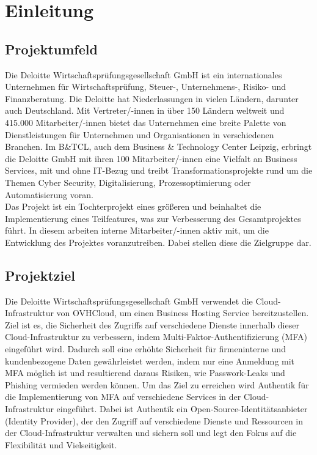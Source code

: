 
\section{Einleitung}
\label{sec:Einleitung}


\subsection{Projektumfeld} 
\label{sec:Projektumfeld}
Die Deloitte Wirtschaftsprüfungsgesellschaft GmbH ist ein internationales 
Unternehmen für Wirtschaftsprüfung, Steuer-, Unternehmens-, Risiko- und Finanzberatung.
Die Deloitte hat Niederlassungen in vielen Ländern, darunter auch Deutschland. 
Mit Vertreter/-innen in über 150 Ländern weltweit und 415.000 Mitarbeiter/-innen bietet das Unternehmen eine breite Palette 
von Dienstleistungen für Unternehmen und Organisationen in verschiedenen Branchen.
Im B\&TCL, auch dem Business \& Technology Center Leipzig, erbringt die Deloitte
GmbH mit ihren 100 Mitarbeiter/-innen eine Vielfalt an Business Services, mit und ohne IT-Bezug und treibt
Transformationsprojekte rund um die Themen Cyber Security, Digitalisierung,
Prozessoptimierung oder Automatisierung voran.
\\Das Projekt ist ein Tochterprojekt eines größeren und beinhaltet die Implementierung eines Teilfeatures, was zur 
Verbesserung des Gesamtprojektes führt. In diesem arbeiten interne Mitarbeiter/-innen aktiv mit, um die Entwicklung des
Projektes voranzutreiben. Dabei stellen diese die Zielgruppe dar.


\subsection{Projektziel} 
\label{sec:Projektziel}
Die Deloitte Wirtschaftsprüfungsgesellschaft GmbH verwendet die Cloud-Infrastruktur von OVHCloud, um einen Business 
Hosting Service bereitzustellen. 
\\Ziel ist es, die Sicherheit des Zugriffs auf verschiedene Dienste innerhalb dieser Cloud-Infrastruktur zu verbessern, indem 
Multi-Faktor-Authentifizierung (MFA) eingeführt wird. Dadurch soll eine erhöhte Sicherheit für firmeninterne und kundenbezogene 
Daten gewährleistet werden, indem nur eine Anmeldung mit MFA möglich ist und resultierend daraus Risiken, wie Passwork-Leaks 
und Phishing vermieden werden können.
Um das Ziel zu erreichen wird Authentik für die Implementierung von MFA auf verschiedene Services in der 
Cloud-Infrastruktur eingeführt. 
Dabei ist Authentik ein Open-Source-Identitätsanbieter (Identity Provider), der den Zugriff auf verschiedene Dienste und 
Ressourcen in der Cloud-Infrastruktur verwalten und sichern soll und legt den Fokus auf die Flexibilität und Vielseitigkeit. 



